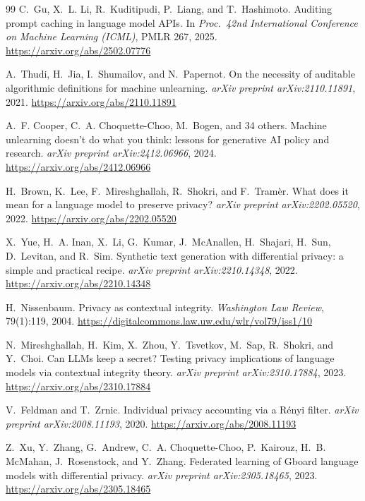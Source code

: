 \documentclass[11pt,a4paper]{article}
\theoremstyle{definition}
\begin{document}
\begin{thebibliography}{99}
 C.~Gu, X.~L. Li, R.~Kuditipudi, P.~Liang, and T.~Hashimoto. Auditing
prompt caching in language model APIs. In \emph{Proc.\ 42nd International Conference on Machine
Learning (ICML)}, PMLR 267, 2025. \url{https://arxiv.org/abs/2502.07776}

 A.~Thudi, H.~Jia, I.~Shumailov, and N.~Papernot. On the necessity
of auditable algorithmic definitions for machine unlearning. \emph{arXiv preprint
arXiv:2110.11891}, 2021. \url{https://arxiv.org/abs/2110.11891}

 A.~F. Cooper, C.~A. Choquette-Choo, M.~Bogen, and 34 others.
Machine unlearning doesn't do what you think: lessons for generative AI policy and research.
\emph{arXiv preprint arXiv:2412.06966}, 2024. \url{https://arxiv.org/abs/2412.06966}

 H.~Brown, K.~Lee, F.~Mireshghallah, R.~Shokri, and F.~Tram\`er. What
does it mean for a language model to preserve privacy? \emph{arXiv preprint arXiv:2202.05520},
2022. \url{https://arxiv.org/abs/2202.05520}

 X.~Yue, H.~A. Inan, X.~Li, G.~Kumar, J.~McAnallen, H.~Shajari,
H.~Sun, D.~Levitan, and R.~Sim. Synthetic text generation with differential privacy: a simple
and practical recipe. \emph{arXiv preprint arXiv:2210.14348}, 2022.
\url{https://arxiv.org/abs/2210.14348}

 H.~Nissenbaum. Privacy as contextual integrity. \emph{Washington Law
Review}, 79(1):119, 2004.
\url{https://digitalcommons.law.uw.edu/wlr/vol79/iss1/10}

 N.~Mireshghallah, H.~Kim, X.~Zhou, Y.~Tsvetkov, M.~Sap,
R.~Shokri, and Y.~Choi. Can LLMs keep a secret? Testing privacy implications of language models
via contextual integrity theory. \emph{arXiv preprint arXiv:2310.17884}, 2023.
\url{https://arxiv.org/abs/2310.17884}

 V.~Feldman and T.~Zrnic. Individual privacy accounting via a R\'enyi
filter. \emph{arXiv preprint arXiv:2008.11193}, 2020. \url{https://arxiv.org/abs/2008.11193}

 Z.~Xu, Y.~Zhang, G.~Andrew, C.~A. Choquette-Choo, P.~Kairouz,
H.~B. McMahan, J.~Rosenstock, and Y.~Zhang. Federated learning of Gboard language models with
differential privacy. \emph{arXiv preprint arXiv:2305.18465}, 2023.
\url{https://arxiv.org/abs/2305.18465}


\end{thebibliography}
\end{document}
